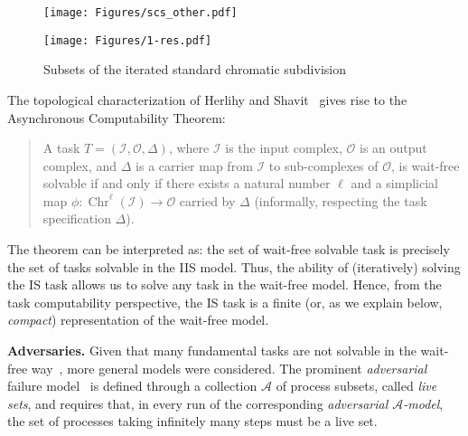 \documentclass[a4paper]{article}
\newcommand{\myparagraph}[1]{\vspace{6pt}\noindent \textbf{#1}}
\def\A{\ensuremath{\mathcal{A}}}
\def\I{\ensuremath{\mathcal{I}}}
\def\O{\ensuremath{\mathcal{O}}}
\def\s {\mathbf{s}}
\def\Chr{\operatorname{Chr}}
\def\O {\mathcal{O}}
\def\I {\mathcal{I}}
\begin{document}
\begin{figure}
\captionsetup[subfigure]{justification=centering}
  \begin{minipage}[b]{.49\linewidth}
    \centering
\texttt{[image: Figures/scs\_other.pdf]}
   \subcaption{\footnotesize{$\Chr^1(\s)$, the output complex of IS}}
  \end{minipage}
  \hfill
  \begin{minipage}[b]{.49\linewidth}
    \begin{center}
\texttt{[image: Figures/1-res.pdf]}
    \end{center}
  \end{minipage}
  \caption{\small{Subsets of the iterated standard chromatic subdivision}}
  \label{Fig:scs}
\end{figure}

The topological characterization of Herlihy
and Shavit~\cite{HS99} gives rise to the Asynchronous Computability
Theorem:

\begin{quote}
A task $T=(\I,\O,\Delta)$, where $\I$ is the input complex, $\O$ is an
output complex, and $\Delta$ is a carrier map from $\I$ to sub-complexes of
$\O$, is wait-free solvable 
if and only if there exists a natural number $\ell$ and a simplicial map
$\phi: \Chr^{\ell}(\I) \rightarrow \O$ carried by $\Delta$
(informally, respecting the task specification $\Delta$).
\end{quote}

The theorem can be interpreted as: the set of wait-free solvable task is precisely the set of tasks
solvable in the IIS model. 
Thus, the ability of (iteratively) solving the IS task allows us
to solve any task in the wait-free model.
Hence, from the task computability perspective, the IS task is a finite (or, as we
explain below,  \emph{compact}) representation of the
wait-free model.  



\myparagraph{Adversaries.}
%
Given that many fundamental tasks are not solvable in the wait-free
way~\cite{BG93b,HS99,SZ00}, more general models were considered.  
The prominent \emph{adversarial} failure model~\cite{DFGT11} 
is defined through a collection $\A$ of process subsets, called \emph{live sets}, and
requires that, in every run of the corresponding \emph{adversarial $\A$-model}, the set of
processes taking infinitely many steps must be a live set.
\end{document}
